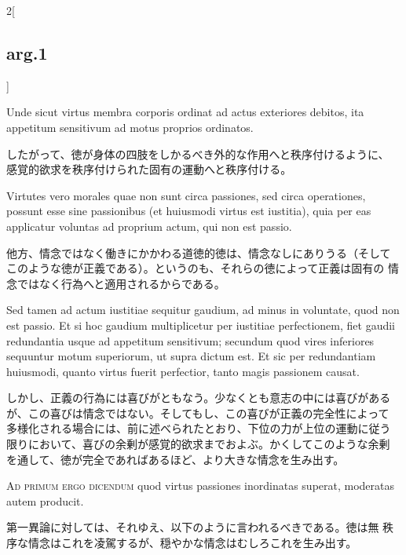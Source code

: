 \documentclass[paper=a4paper,fontsize=10pt,jafontsize=9pt,titlepage]{jlreq}
\begin{document}
\begin{paracol}{2}[\subsection{arg.1}]
\switchcolumn*

Unde sicut virtus membra corporis ordinat ad actus exteriores
 debitos, ita appetitum sensitivum ad motus proprios
 ordinatos.

\switchcolumn

したがって、徳が身体の四肢をしかるべき外的な作用へと秩序付けるように、
 感覚的欲求を秩序付けられた固有の運動へと秩序付ける。

\switchcolumn*

Virtutes vero morales quae non sunt circa passiones, sed
 circa operationes, possunt esse sine passionibus (et huiusmodi virtus
 est iustitia), quia per eas applicatur voluntas ad proprium actum,
 qui non est passio.

\switchcolumn

他方、情念ではなく働きにかかわる道徳的徳は、情念なしにありうる（そして
このような徳が正義である）。というのも、それらの徳によって正義は固有の
情念ではなく行為へと適用されるからである。

\switchcolumn*

Sed tamen ad actum iustitiae sequitur gaudium, ad minus in voluntate,
 quod non est passio. Et si hoc gaudium multiplicetur per iustitiae
 perfectionem, fiet gaudii redundantia usque ad appetitum sensitivum;
 secundum quod vires inferiores sequuntur motum superiorum, ut supra
 dictum est. Et sic per redundantiam huiusmodi, quanto virtus fuerit
 perfectior, tanto magis passionem causat.

\switchcolumn

しかし、正義の行為には喜びがともなう。少なくとも意志の中には喜びがある
が、この喜びは情念ではない。そしてもし、この喜びが正義の完全性によって
多様化される場合には、前に述べられたとおり、下位の力が上位の運動に従う
限りにおいて、喜びの余剰が感覚的欲求までおよぶ。かくしてこのような余剰
を通して、徳が完全であればあるほど、より大きな情念を生み出す。

\switchcolumn*[\subsection{ad.1}]

{\scshape Ad primum ergo dicendum} quod virtus passiones inordinatas
 superat, moderatas autem producit.

\switchcolumn

第一異論に対しては、それゆえ、以下のように言われるべきである。徳は無
 秩序な情念はこれを凌駕するが、穏やかな情念はむしろこれを生み出す。

\switchcolumn*[\subsection{ad.2}]


\end{paracol}
\end{document}
